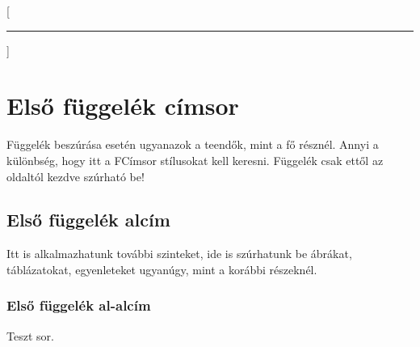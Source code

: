 \documentclass[a4paper, 12pt]{article}
\begin{document}
	[\vspace{-3ex}\rule{\textwidth}{0.5pt}]

	\section{Első függelék címsor}
	Függelék beszúrása esetén ugyanazok a teendők, mint a fő résznél.
	Annyi a különbség, hogy itt a FCímsor stílusokat kell keresni.
	Függelék csak ettől az oldaltól kezdve szúrható be!
	\subsection{Első függelék alcím}
	Itt is alkalmazhatunk további szinteket, ide is szúrhatunk be ábrákat, táblázatokat, egyenleteket ugyanúgy, mint a korábbi részeknél.
	\subsubsection{Első függelék al-alcím}
	Teszt sor.
\end{document}
